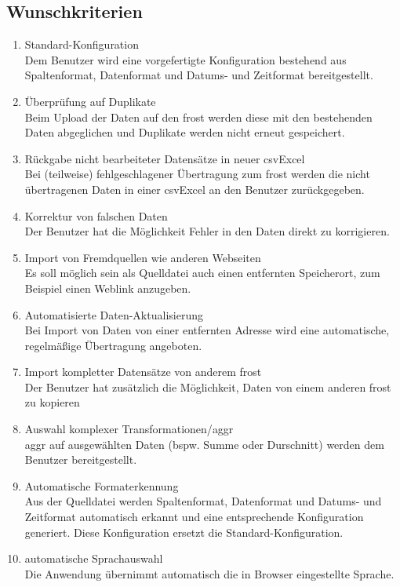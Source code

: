 \documentclass[a4paper, 12 pt]{article}
\begin{document}
	\subsection{Wunschkriterien}
	\begin{enumerate}
	\item Standard-Konfiguration \\
	Dem Benutzer wird eine vorgefertigte Konfiguration bestehend aus Spaltenformat, Datenformat und Datums- und Zeitformat bereitgestellt.
	\item Überprüfung auf Duplikate \\
	Beim Upload der Daten auf den \gls{frost} werden diese mit den bestehenden Daten abgeglichen und Duplikate werden nicht erneut gespeichert.
	\item Rückgabe nicht bearbeiteter Datensätze in neuer \gls{csvExcel} \\
	Bei (teilweise) fehlgeschlagener Übertragung zum \gls{frost} werden die nicht übertragenen Daten in einer \gls{csvExcel} an den Benutzer zurückgegeben.
	\item Korrektur von falschen Daten \\
	Der Benutzer hat die Möglichkeit Fehler in den Daten direkt zu korrigieren.
	\item Import von Fremdquellen wie anderen Webseiten \\
	Es soll möglich sein als Quelldatei auch einen entfernten Speicherort, zum Beispiel einen Weblink anzugeben.
	\item Automatisierte Daten-Aktualisierung \\
	Bei Import von Daten von einer entfernten Adresse wird eine automatische, regelmäßige Übertragung angeboten.
	\item Import kompletter Datensätze von anderem \gls{frost} \\
	Der Benutzer hat zusätzlich die Möglichkeit, Daten von einem anderen \gls{frost} zu kopieren
	\item Auswahl komplexer Transformationen/\gls{aggr}\\ 
	\gls{aggr} auf ausgewählten Daten (bspw. Summe oder Durschnitt) werden dem Benutzer bereitgestellt.
	\item Automatische Formaterkennung \\
	Aus der Quelldatei werden Spaltenformat, Datenformat und Datums- und Zeitformat automatisch erkannt und eine entsprechende Konfiguration generiert.
	Diese Konfiguration ersetzt die Standard-Konfiguration.
	\item automatische Sprachauswahl \\
	Die Anwendung übernimmt automatisch die in Browser eingestellte Sprache.
	\end{enumerate}
\end{document}
